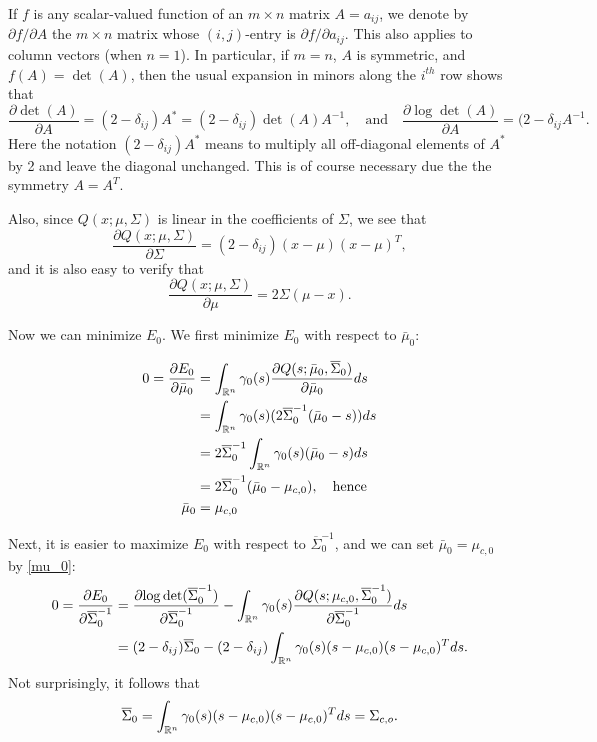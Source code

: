 \documentclass[12pt,leqno]{article}
\begin{document}
If $f$ is any scalar-valued function of an $m\times{n}$ matrix $A = a_{ij}$, we denote by $\partial{f}/\partial{A}$ the 
$m\times{n}$ matrix whose $(i,j)$-entry is $\partial{f}/\partial{a_{ij}}$.  This also applies to column vectors (when $n=1$).
In particular, if $m=n$, $A$ is symmetric, and $f(A) = \det(A)$,  then the usual expansion 
in minors along the $i^{th}$ row shows that 
$$
\frac{\partial{\det(A)}}{\partial{A}} = (2-\delta_{ij})A^* = (2-\delta_{ij})\det(A)A^{-1},\quad\text{and}
\quad\frac{\partial{\log\det(A)}}{\partial{A}} = (2-\delta_{ij}A^{-1}. 
$$
Here the notation $(2-\delta_{ij})A^*$ means to multiply all off-diagonal elements of $A^*$ by 2 and leave the diagonal unchanged.
This is of course necessary due the the symmetry $A = A^T$.

Also, since $Q(x;\mu,\Sigma)$ is linear in the coefficients of $\Sigma$, we see that
$$
\frac{\partial{Q(x;\mu,\Sigma)}}{\partial{\Sigma}} = (2-\delta_{ij})(x-\mu)(x-\mu)^T,
$$
and it is also easy to verify that
$$
\frac{\partial{Q(x;\mu,\Sigma)}}{\partial{\mu}} = 2\Sigma(\mu-x).
$$

Now we can minimize $E_0$. We first minimize $E_0$ with respect to $\bar{\mu}_0$: 

\begin{align}
0 = \frac{\partial{E_0}}{\partial{\bar{\mu}_0}} &= \int_{{\mathbb R}^n}\gamma_0(s)\frac{\partial{Q(s;\bar{\mu}_0,\overline{\Sigma}_0)}}{\partial{\bar{\mu}_0}}ds \notag\\
&= \int_{{\mathbb R}^n}\gamma_0(s)(2\overline{\Sigma}_0^{-1}(\bar{\mu}_0-s))ds\notag\\
&= 2\overline{\Sigma}_0^{-1}\int_{{\mathbb R}^n}\gamma_0(s)(\bar{\mu}_0-s)ds \notag\\
&= 2\overline{\Sigma}_0^{-1}(\bar{\mu}_0-\mu_{c,0}), \quad\text{hence}\notag\\
\bar{\mu}_0 &= \mu_{c,0}\label{mu_0}
\end{align}

Next, it is easier to maximize $E_0$ with respect to $\overline{\Sigma}_0^{-1}$, and we can set $\bar{\mu}_0 = \mu_{c,0}$ by \eqref{mu_0}:
\begin{align*}
0 = \frac{\partial{E_0}}{\partial{\overline{\Sigma}_0^{-1}}} &= \frac{\partial{\log\det(\overline{\Sigma}_0^{-1})}}{\partial\overline{\Sigma}_0^{-1}} - \int_{{\mathbb R}^n}\gamma_0(s)\frac{\partial{Q(s;\mu_{c,0},\overline{\Sigma}_0^{-1})}}{\partial{\overline{\Sigma}_0^{-1}}}ds \\
&= (2-\delta_{ij})\overline{\Sigma}_0 - (2-\delta_{ij})\int_{{\mathbb R}^n}\gamma_0(s)(s-\mu_{c,0})(s-\mu_{c,0})^Tds.
\end{align*}
Not surprisingly, it follows that
\begin{equation}\label{Sigma_0}
  \overline{\Sigma}_0 = \int_{{\mathbb R}^n}\gamma_0(s)(s-\mu_{c,0})(s-\mu_{c,0})^Tds = \Sigma_{c,o}.
  \end{equation}
\end{document}
